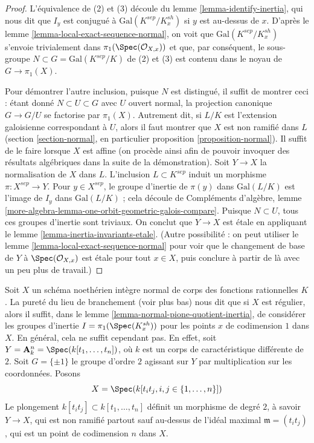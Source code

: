 \begin{proof}
L'équivalence de (2) et (3) découle du
lemme \ref{lemma-identify-inertia},
qui nous dit que $I_y$ est conjugué à $\text{Gal}(K^{sep}/K_x^{sh})$
si $y$ est au-dessus de $x$. D'après le lemme \ref{lemma-local-exact-sequence-normal},
on voit que $\text{Gal}(K^{sep}/K_x^{sh})$ s'envoie trivialement dans
$\pi_1(\Spec(\mathcal{O}_{X, x}))$ et que, par conséquent, le sous-groupe
$N \subset G = \text{Gal}(K^{sep}/K)$
de (2) et (3) est contenu dans le noyau de
$G \longrightarrow \pi_1(X)$.

\medskip\noindent
Pour démontrer l'autre inclusion, puisque $N$ est distingué, il suffit de montrer ceci :
étant donné $N \subset U \subset G$ avec $U$ ouvert normal,
la projection canonique $G \to G/U$ se factorise par $\pi_1(X)$.
Autrement dit, si $L/K$ est l'extension galoisienne correspondant
à $U$, alors il faut montrer que $X$ est non ramifié dans $L$
(section \ref{section-normal}, en particulier
proposition \ref{proposition-normal}).
Il suffit de le faire lorsque $X$ est affine (on procède ainsi
afin de pouvoir invoquer des résultats algébriques dans la suite de la démonstration).
Soit $Y \to X$ la normalisation de $X$ dans $L$.
L'inclusion $L \subset K^{sep}$ induit un morphisme
$\pi : X^{sep} \to Y$. Pour $y \in X^{sep}$,
le groupe d'inertie de $\pi(y)$ dans $\text{Gal}(L/K)$
est l'image de $I_y$ dans $\text{Gal}(L/K)$ ; cela découle
de Compléments d'algèbre, lemme
\ref{more-algebra-lemma-one-orbit-geometric-galois-compare}.
Puisque $N \subset U$, tous ces groupes d'inertie sont triviaux.
On conclut que $Y \to X$ est étale en appliquant le
lemme \ref{lemma-inertia-invariants-etale}.
(Autre possibilité : on peut utiliser le lemme \ref{lemma-local-exact-sequence-normal}
pour voir que le changement de base de $Y$ à $\Spec(\mathcal{O}_{X, x})$ est
étale pour tout $x \in X$, puis conclure à partir de là
avec un peu plus de travail.)
\end{proof}

\begin{example}
\label{example-bigger-codim}
Soit $X$ un schéma noethérien intègre normal de corps des fonctions rationnelles $K$.
La pureté du lieu de branchement (voir plus bas) nous dit que si $X$ est régulier, alors
il suffit, dans le lemme \ref{lemma-normal-pione-quotient-inertia},
de considérer les groupes d'inertie $I = \pi_1(\Spec(K_x^{sh}))$
pour les points $x$ de codimension $1$ dans $X$.
En général, cela ne suffit cependant pas. En effet, soit
$Y = \mathbf{A}_k^n = \Spec(k[t_1, \ldots, t_n])$,
où $k$ est un corps de caractéristique différente de $2$.
Soit $G = \{\pm 1\}$ le groupe d'ordre $2$ agissant sur $Y$
par multiplication sur les coordonnées. Posons
$$
X = \Spec(k[t_it_j, i, j \in \{1, \ldots, n\}])
$$
Le plongement $k[t_it_j] \subset k[t_1, \ldots, t_n]$
définit un morphisme de degré $2$, à savoir $Y \to X$, qui est non ramifié partout
sauf au-dessus de l'idéal maximal $\mathfrak m = (t_it_j)$,
qui est un point de codimension $n$ dans $X$.
\end{example}


